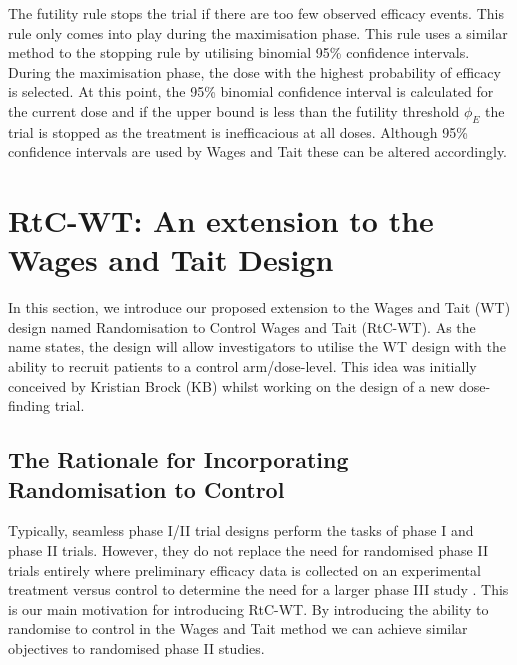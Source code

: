 The futility rule stops the trial if there are too few observed efficacy events. This rule only comes into play during the maximisation phase. This rule uses a similar method to the stopping rule by utilising binomial 95\% confidence intervals. During the maximisation phase, the dose with the highest probability of efficacy is selected. At this point, the 95\% binomial confidence interval is calculated for the current dose and if the upper bound is less than the futility threshold $\phi_E$ the trial is stopped as the treatment is inefficacious at all doses. Although 95\% confidence intervals are used by Wages and Tait these can be altered accordingly. 


\section{RtC-WT: An extension to the Wages and Tait Design}
\label{WT:RtC-WT}

In this section, we introduce our proposed extension to the Wages and Tait (WT) design named Randomisation to Control Wages and Tait (RtC-WT). As the name states, the design will allow investigators to utilise the WT design with the ability to recruit patients to a control arm/dose-level. This idea was initially conceived by Kristian Brock (KB) whilst working on the design of a new dose-finding trial.  

\subsection{The Rationale for Incorporating Randomisation to Control}
\label{WT:Rationale-for-RtC-WT}

Typically, seamless phase \RN{1}/\RN{2} trial designs perform the tasks of phase \RN{1} and phase \RN{2} trials. However, they do not replace the need for randomised phase \RN{2} trials entirely where preliminary efficacy data is collected on an experimental treatment versus control to determine the need for a larger phase \RN{3} study \cite{yinClinicalTrialDesign2012}. This is our main motivation for introducing RtC-WT. By introducing the ability to randomise to control in the Wages and Tait method we can achieve similar objectives to randomised phase \RN{2} studies. 


